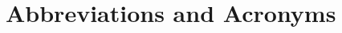 \documentclass[10pt,oneside]{report}
\renewcommand{\small}{\fontsize{7}{8}\selectfont}
\begin{document}
\tableofcontents
\clearpage

\listoffigures
\clearpage

\listoftables
\clearpage


{}
\chapter*{Abbreviations and Acronyms}

\begin{multicols}{2}
\begin{description}
    \small


\end{description}
\end{multicols}
\end{document}
